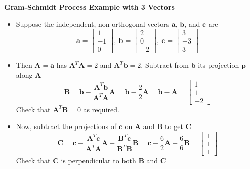\documentclass[11pt]{article}
\begin{document}
\textbf{Gram-Schmidt Process Example with 3 Vectors}
\begin{itemize}
    \item Suppose the independent, non-orthogonal vectors $\boldsymbol{a}$, $\boldsymbol{b}$,
    and $\boldsymbol{c}$ are
    \[
    \boldsymbol{a} =
    \begin{bmatrix}
        1 \\
        -1 \\
        0
    \end{bmatrix}, \
    \boldsymbol{b} =
    \begin{bmatrix}
        2 \\
        0 \\
        -2
    \end{bmatrix}, \
    \boldsymbol{c} =
    \begin{bmatrix}
        3 \\
        -3 \\
        3
    \end{bmatrix}    
    \]
    \item Then $\boldsymbol{A} = \boldsymbol{a}$ has $\boldsymbol{A}^T \boldsymbol{A} = 2$ and
    $\boldsymbol{A}^T \boldsymbol{b} = 2$. Subtract from $\boldsymbol{b}$ its projection 
    $\boldsymbol{p}$ along $\boldsymbol{A}$
    \[\boldsymbol{B} = \boldsymbol{b} - \frac{\boldsymbol{A}^T \boldsymbol{b}}
    {\boldsymbol{A}^T \boldsymbol{A}} \boldsymbol{A} = \boldsymbol{b} - \frac{2}{2} 
    \boldsymbol{A} = \boldsymbol{b} - \boldsymbol{A} = \begin{bmatrix}
        1 \\ 
        1 \\ 
        -2
    \end{bmatrix}\]
    Check that $\boldsymbol{A}^T \boldsymbol{B} = 0$ as required.
    \item Now, subtract the projections of $\boldsymbol{c}$ on $\boldsymbol{A}$ and 
    $\boldsymbol{B}$ to get $\boldsymbol{C}$
    \[\boldsymbol{C} = \boldsymbol{c} - \frac{\boldsymbol{A}^T \boldsymbol{c}}
    {\boldsymbol{A}^T \boldsymbol{A}} \boldsymbol{A} - \frac{\boldsymbol{B}^T \boldsymbol{c}}
    {\boldsymbol{B}^T \boldsymbol{B}} \boldsymbol{B} = \boldsymbol{c} - \frac{6}{2}
    \boldsymbol{A} + \frac{6}{6}\boldsymbol{B} = \begin{bmatrix}
        1 \\
        1 \\
        1
    \end{bmatrix}\]
    Check that $\boldsymbol{C}$ is perpendicular to both $\boldsymbol{B}$ and $\boldsymbol{C}$

\end{itemize}
\end{document}
